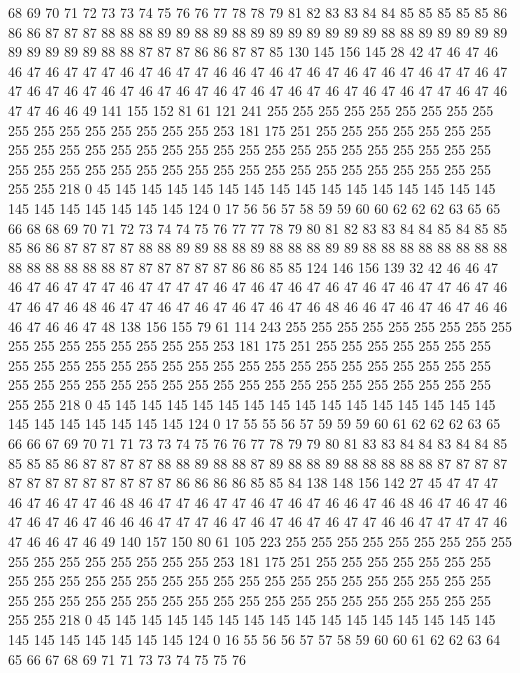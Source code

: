 68 69 70 71 72 73 73 74 75 76 76 77 78 78 79 81 82 83 83 84
84 85 85 85 85 85 86 86 86 87 87 87 88 88 88 89 89 88 89 88
89 89 89 89 89 89 89 88 88 89 89 89 89 89 89 89 89 89 89 88
88 87 87 87 86 86 87 87 85 130 145 156 145 28 42 47 46 47 46 46
47 46 47 47 47 46 47 46 47 47 46 46 47 46 47 46 47 46 47 46
47 46 47 47 46 47 47 46 47 46 47 46 47 46 47 46 47 46 47 46
47 46 47 46 47 46 47 46 47 47 46 47 46 47 47 46 46 49 141 155
152 81 61 121 241 255 255 255 255 255 255 255 255 255 255 255 255 255 255 255
255 255 253 181 175 251 255 255 255 255 255 255 255 255 255 255 255 255 255 255
255 255 255 255 255 255 255 255 255 255 255 255 255 255 255 255 255 255 255 255
255 255 255 255 255 255 255 255 255 255 255 255 255 218 0 45 145 145 145 145
145 145 145 145 145 145 145 145 145 145 145 145 145 145 145 145 145 145 124 0
17 56 56 57 58 59 59 60 60 62 62 62 63 65 65 66 68 68 69 70
71 72 73 74 74 75 76 77 77 78 79 80 81 82 83 83 84 84 85 84
85 85 85 86 86 87 87 87 87 88 88 89 89 88 88 89 88 88 88 89
89 88 88 88 88 88 88 88 88 88 88 88 88 88 88 87 87 87 87 87
87 86 86 85 85 124 146 156 139 32 42 46 46 47 46 47 46 47 47 47
46 47 47 47 47 46 47 46 47 46 47 46 47 46 47 46 47 47 46 47
46 47 46 47 46 48 46 47 47 46 47 46 47 46 47 46 47 46 48 46
46 47 46 47 46 47 46 46 46 47 46 46 47 48 138 156 155 79 61 114
243 255 255 255 255 255 255 255 255 255 255 255 255 255 255 255 255 255 253 181
175 251 255 255 255 255 255 255 255 255 255 255 255 255 255 255 255 255 255 255
255 255 255 255 255 255 255 255 255 255 255 255 255 255 255 255 255 255 255 255
255 255 255 255 255 255 255 255 255 218 0 45 145 145 145 145 145 145 145 145
145 145 145 145 145 145 145 145 145 145 145 145 145 145 124 0 17 55 55 56
57 59 59 59 60 61 62 62 62 63 65 66 66 67 69 70 71 71 73 73
74 75 76 76 77 78 79 79 80 81 83 83 84 84 83 84 84 85 85 85
85 86 87 87 87 87 88 88 89 88 88 87 89 88 88 89 88 88 88 88
88 87 87 87 87 87 87 87 87 87 87 87 87 87 86 86 86 86 85 85
84 138 148 156 142 27 45 47 47 47 46 47 46 47 47 46 48 46 47 47
46 47 47 46 47 46 47 46 46 47 46 48 46 47 46 47 46 47 46 47
46 47 46 46 46 47 47 47 46 47 46 47 46 47 46 47 47 46 46 47
47 47 47 46 47 46 46 47 46 49 140 157 150 80 61 105 223 255 255 255
255 255 255 255 255 255 255 255 255 255 255 255 255 255 253 181 175 251 255 255
255 255 255 255 255 255 255 255 255 255 255 255 255 255 255 255 255 255 255 255
255 255 255 255 255 255 255 255 255 255 255 255 255 255 255 255 255 255 255 255
255 255 255 255 255 218 0 45 145 145 145 145 145 145 145 145 145 145 145 145
145 145 145 145 145 145 145 145 145 145 124 0 16 55 56 56 57 57 58 59
60 60 61 62 62 63 64 65 66 67 68 69 71 71 73 73 74 75 75 76
